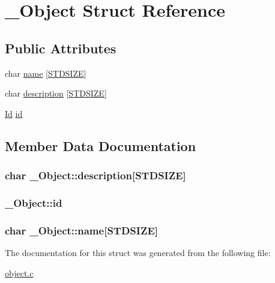 \hypertarget{struct__Object}{}\section{\+\_\+\+Object Struct Reference}
\label{struct__Object}
\subsection*{Public Attributes}
\begin{DoxyCompactItemize}
\item 
char \hyperlink{struct__Object_a5f13167436f75d12f48d3f152ce91d0a}{name} \mbox{[}\hyperlink{types_8h_a431b1676533a0e1714aff7d6a5542406}{S\+T\+D\+S\+I\+ZE}\mbox{]}
\item 
char \hyperlink{struct__Object_a4797c28bbea5a64792ec85433ee7215e}{description} \mbox{[}\hyperlink{types_8h_a431b1676533a0e1714aff7d6a5542406}{S\+T\+D\+S\+I\+ZE}\mbox{]}
\item 
\hyperlink{types_8h_a845e604fb28f7e3d97549da3448149d3}{Id} \hyperlink{struct__Object_a3cff7a0e8dc4e9d23895ed9af1b7653a}{id}
\end{DoxyCompactItemize}


\subsection{Member Data Documentation}
\subsubsection[{\texorpdfstring{description}{description}}]{\setlength{\rightskip}{0pt plus 5cm}char \+\_\+\+Object\+::description\mbox{[}{\bf S\+T\+D\+S\+I\+ZE}\mbox{]}}\hypertarget{struct__Object_a4797c28bbea5a64792ec85433ee7215e}{}\label{struct__Object_a4797c28bbea5a64792ec85433ee7215e}
\subsubsection[{\texorpdfstring{id}{id}}]{ \+\_\+\+Object\+::id}\hypertarget{struct__Object_a3cff7a0e8dc4e9d23895ed9af1b7653a}{}\label{struct__Object_a3cff7a0e8dc4e9d23895ed9af1b7653a}
\subsubsection[{\texorpdfstring{name}{name}}]{\setlength{\rightskip}{0pt plus 5cm}char \+\_\+\+Object\+::name\mbox{[}{\bf S\+T\+D\+S\+I\+ZE}\mbox{]}}\hypertarget{struct__Object_a5f13167436f75d12f48d3f152ce91d0a}{}\label{struct__Object_a5f13167436f75d12f48d3f152ce91d0a}


The documentation for this struct was generated from the following file\+:\begin{DoxyCompactItemize}
\item 
\hyperlink{object_8c}{object.\+c}\end{DoxyCompactItemize}
